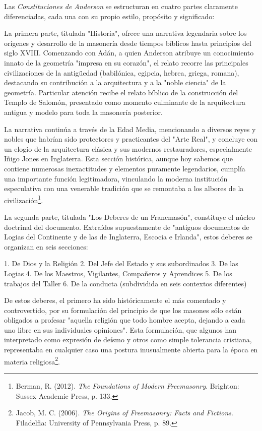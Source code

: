 \documentclass[a4paper,12pt,twoside]{book}
\begin{document}
Las \textit{Constituciones de Anderson} se estructuran en cuatro partes claramente diferenciadas, cada una con su propio estilo, propósito y significado:

La primera parte, titulada "Historia", ofrece una narrativa legendaria sobre los orígenes y desarrollo de la masonería desde tiempos bíblicos hasta principios del siglo XVIII. Comenzando con Adán, a quien Anderson atribuye un conocimiento innato de la geometría "impresa en su corazón", el relato recorre las principales civilizaciones de la antigüedad (babilónica, egipcia, hebrea, griega, romana), destacando su contribución a la arquitectura y a la "noble ciencia" de la geometría. Particular atención recibe el relato bíblico de la construcción del Templo de Salomón, presentado como momento culminante de la arquitectura antigua y modelo para toda la masonería posterior.

La narrativa continúa a través de la Edad Media, mencionando a diversos reyes y nobles que habrían sido protectores y practicantes del "Arte Real", y concluye con un elogio de la arquitectura clásica y sus modernos restauradores, especialmente Iñigo Jones en Inglaterra. Esta sección histórica, aunque hoy sabemos que contiene numerosas inexactitudes y elementos puramente legendarios, cumplía una importante función legitimadora, vinculando la moderna institución especulativa con una venerable tradición que se remontaba a los albores de la civilización\footnote{Berman, R. (2012). \textit{The Foundations of Modern Freemasonry}. Brighton: Sussex Academic Press, p. 133.}.

La segunda parte, titulada "Los Deberes de un Francmasón", constituye el núcleo doctrinal del documento. Extraídos supuestamente de "antiguos documentos de Logias del Continente y de las de Inglaterra, Escocia e Irlanda", estos deberes se organizan en seis secciones:

1. De Dios y la Religión
2. Del Jefe del Estado y sus subordinados
3. De las Logias
4. De los Maestros, Vigilantes, Compañeros y Aprendices
5. De los trabajos del Taller
6. De la conducta (subdividida en seis contextos diferentes)

De estos deberes, el primero ha sido históricamente el más comentado y controvertido, por su formulación del principio de que los masones sólo están obligados a profesar "aquella religión que todo hombre acepta, dejando a cada uno libre en sus individuales opiniones". Esta formulación, que algunos han interpretado como expresión de deísmo y otros como simple tolerancia cristiana, representaba en cualquier caso una postura inusualmente abierta para la época en materia religiosa\footnote{Jacob, M. C. (2006). \textit{The Origins of Freemasonry: Facts and Fictions}. Filadelfia: University of Pennsylvania Press, p. 89.}.
\end{document}
